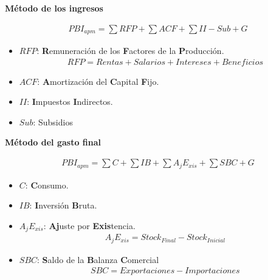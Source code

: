 \documentclass[12pt,a4paper]{article}
\begin{document}
    
    \hrulefill
    
    \textbf{Método de los ingresos}
    
    \begin{align}
		{PBI}_{apm} = \sum RFP + \sum ACF + \sum II - Sub + G
        \label{metodo_de_los_ingresos}
	\end{align}
    
    \begin{itemize}
		\item $RFP$: \textbf{R}emuneración de los \textbf{F}actores de la \textbf{P}roducción.
        	\begin{align}
				RFP = Rentas + Salarios + Intereses + Beneficios
			\end{align}
            
        \item $ACF$: \textbf{A}mortización del \textbf{C}apital \textbf{F}ijo.
        
        \item $II$: \textbf{I}mpuestos \textbf{I}ndirectos.
        
        \item $Sub$: Subsidios
        
	\end{itemize}
    
    
    \newpage
    
    \textbf{Método del gasto final}
    
    \begin{align}
		{PBI}_{apm} = \sum C + \sum IB + \sum {A}_{j} {E}_{xis} + \sum SBC + G
        \label{metodo_del_gasto_final}
	\end{align}
    
    \begin{itemize}
		\item $C$: \textbf{C}onsumo.
            
        \item $IB$: \textbf{I}nversión \textbf{B}ruta.
        
        \item ${A}_{j} {E}_{xis}$: \textbf{Aj}uste por \textbf{Exis}tencia.
        	\begin{align}
				{A}_{j} {E}_{xis} = {Stock}_{Final} - {Stock}_{Inicial}
			\end{align}
        
        \item $SBC$: \textbf{S}aldo de la \textbf{B}alanza \textbf{C}omercial
        	\begin{align}
				SBC = Exportaciones - Importaciones
			\end{align}
        
	\end{itemize}
    
\end{document}
